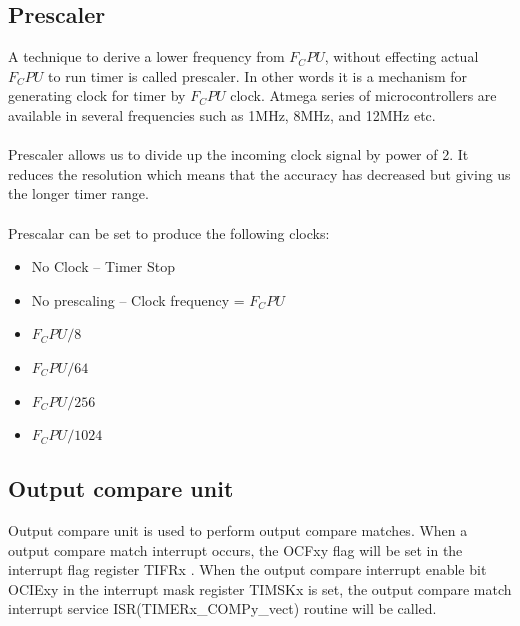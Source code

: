 \documentclass[english]{article}
\begin{document}
\subsection{Prescaler}
A technique to derive a lower frequency from $F_CPU$, without effecting actual $F_CPU$ to run timer is called prescaler. In other words it is a mechanism for generating clock for timer by $F_CPU$ clock. Atmega series of microcontrollers are available in several frequencies such as 1MHz, 8MHz, and 12MHz etc.\\\\
Prescaler allows us to divide up the incoming clock signal by power of 2. It reduces the resolution which means that the accuracy has decreased but giving us the longer timer range.\\\\

Prescalar can be set to produce the following clocks:
\begin{itemize}
\item No Clock – Timer Stop
\item No prescaling – Clock frequency =  $F_CPU$
\item $F_CPU/8$
\item $F_CPU/64$
\item $F_CPU/256$
\item $F_CPU/1024$
\end{itemize}
\subsection{Output compare unit}   
Output compare unit is used to perform output compare matches. When a output compare match interrupt occurs, the OCFxy flag will be set in the interrupt flag register TIFRx . When the output compare interrupt enable bit OCIExy in the interrupt mask register TIMSKx is set, the output compare match interrupt service ISR(TIMERx\_COMPy\_vect) routine will be called.
  
\end{document}

